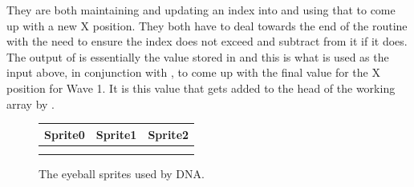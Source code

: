They are both maintaining and updating an index into 
 and using that to come up with a new X position. They both have to deal towards the end
of the routine with the need to ensure the index does not exceed  and subtract  from it if
it does. The output of  is essentially the value stored in 
and this is what is used as the input above, in conjunction with , to come up with the final
value for the X position for Wave 1. It is this value that gets added to the head of the working array 
by .







\begin{figure}[H]
  {
    \setlength{\tabcolsep}{1.0pt}
    \setlength\cmidrulewidth{\heavyrulewidth} %
    \begin{adjustbox}{width=14cm,center}
      \begin{tabular}{ccc}
        \toprule
        Sprite0 & Sprite1 & Sprite2 \\
        \midrule
\makecell[l]{
	\begin{subfigure}{0.3\textwidth}
    \def\MULTICOLORONE{red}
    \def\MULTICOLORTWO{white}
    \def\SPRITECOLOR{yellow}
		
	\end{subfigure}
} &
\makecell[l]{
	\begin{subfigure}{0.3\textwidth}
    \def\MULTICOLORONE{red}
    \def\MULTICOLORTWO{white}
    \def\SPRITECOLOR{green}
		
	\end{subfigure}
} &
\makecell[l]{
	\begin{subfigure}{0.3\textwidth}
    \def\MULTICOLORONE{red}
    \def\MULTICOLORTWO{white}
    \def\SPRITECOLOR{lightblue}
		
	\end{subfigure}
} \\ 
        \addlinespace
        \bottomrule
      \end{tabular}
    \end{adjustbox}
  }\caption{The eyeball sprites used by DNA.}
\end{figure}
